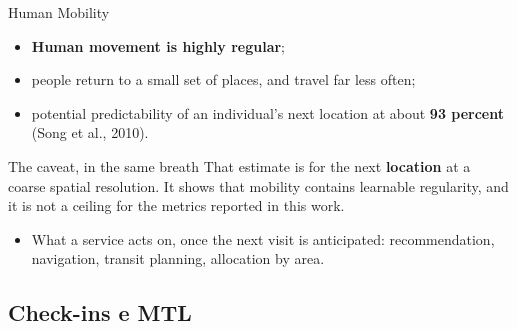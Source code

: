 \documentclass{beamer}
\begin{document}
\begin{frame}{Human Mobility}
    \begin{itemize}
        \item \textbf{Human movement is highly regular};
        \item people return to a small set of places, and travel far less often;
        \item potential predictability of an individual's next location at about
              \textbf{93 percent} (Song et al., 2010).
    \end{itemize}

    \bigskip
    \begin{alertblock}{The caveat, in the same breath}
        \small
        That estimate is for the next \textbf{location} at a coarse spatial resolution. It shows
        that mobility contains learnable regularity, and it is \alert{not a ceiling} for the
        metrics reported in this work.
    \end{alertblock}

    \medskip
    \begin{itemize}
        \item What a service acts on, once the next visit is anticipated: recommendation,
              navigation, transit planning, allocation by area.
    \end{itemize}
\end{frame}

\subsection{Check-ins e MTL}
\end{document}
